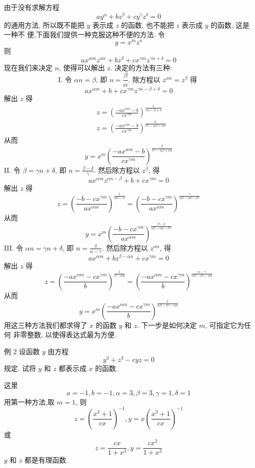 由于没有求解方程
\[
a y^{\alpha}+b z^{\beta}+c y^{\gamma} z^{\delta}=0
\]
的通用方法, 所以既不能把 $y$ 表示成 $z$ 的函数, 也不能把 $z$ 表示成 $y$ 的函数. 这是一种不 便,下面我们提供一种克服这种不便的方法. 令
\[
y=x^{m} z^{n}
\]
则
\[
a x^{\alpha m} z^{\alpha n}+b z^{\beta}+c x^{\gamma m} z^{\gamma n+\delta}=0
\]
现在我们来决定 $n$, 使得可以解出 $z$. 决定的方法有三种:
\[
\mathrm{I} \text {. 令 } \alpha n=\beta \text {, 即 } n=\frac{\beta}{\alpha} \text {. 除方程以 } z^{\alpha n}=z^{\beta} \text { 得 }
\]
\[
a x^{\alpha m}+b+c x^{\gamma m} z^{\gamma n-\beta+\delta}=0
\]
解出 $z$ 得
\[
\begin{aligned}
& z=\left(\frac{-a x^{\alpha m}-b}{c x^{\gamma m}}\right)^{\frac{1}{\gamma n-\beta+\delta}} \\
& z=\left(\frac{-a x^{\alpha m}-b}{c x^{\gamma m}}\right)^{\frac{\alpha}{\beta \gamma-\alpha \beta+\alpha \delta}}
\end{aligned}
\]
从而
\[
y=x^{m}\left(\frac{-a x^{\alpha m}-b}{c x^{\gamma m}}\right)^{\frac{\beta}{\beta \gamma-\alpha \beta+\alpha \delta}}
\]
II. 令 $\beta=\gamma n+\delta$, 即 $n=\frac{\beta-\delta}{\gamma}$. 然后除方程以 $z^{\beta}$, 得
\[
a x^{\alpha m} z^{\alpha n-\beta}+b+c x^{\gamma m}=0
\]
解出 $z$ 得
\[
z=\left(\frac{-b-c x^{\gamma m}}{a x^{\alpha m}}\right)^{\frac{1}{\alpha n-\beta}}=\left(\frac{-b-c x^{\gamma m}}{a x^{\alpha m}}\right)^{\frac{\gamma}{\alpha \beta-\alpha \delta-\beta \gamma}}
\]
从而
\[
y=x^{m}\left(\frac{-b-c x^{\gamma m}}{a x^{\alpha m}}\right)^{\frac{\beta-\delta}{\alpha \beta-\alpha \delta-\beta \gamma}}
\]
III. 令 $\alpha n=\gamma n+\delta$, 即 $n=\frac{\delta}{\alpha-\gamma}$. 然后除方程以 $z^{\alpha n}$, 得
\[
a x^{\alpha m}+b z^{\beta-\alpha n}+c x^{\gamma m}=0
\]
解出 $z$ 得
\[
z=\left(\frac{-a x^{\alpha m}-c x^{\gamma m}}{b}\right)^{\frac{1}{\beta-\alpha n}}=\left(\frac{-a x^{\alpha m}-c x^{\gamma m}}{b}\right)^{\frac{\alpha-\gamma}{\alpha \beta-\beta \gamma-\alpha \delta}}
\]
从而
\[
y=x^{m}\left(\frac{-a x^{\alpha m}-c x^{\gamma m}}{b}\right)^{\frac{\delta}{\alpha \beta-\beta \gamma-\alpha \delta}}
\]
用这三种方法我们都求得了 $x$ 的函数 $y$ 和 $z$. 下一步是如何决定 $m$, 可指定它为任何 非零整数, 以使得表达式最为方便. 

例 2 设函数 $y$ 由方程
\[
y^{3}+z^{3}-c y z=0
\]
规定. 试将 $y$ 和 $z$ 都表示成 $x$ 的函数.

这里
\[
a=-1, b=-1, \alpha=3, \beta=3, \gamma=1, \delta=1
\]
用第一种方法,取 $m=1$, 则
\[
z=\left(\frac{x^{3}+1}{c x}\right)^{-1}, y=x\left(\frac{x^{3}+1}{c x}\right)^{-1}
\]
或
\[
z=\frac{c x}{1+x^{3}}, y=\frac{c x^{2}}{1+x^{3}}
\]
$y$ 和 $z$ 都是有理函数.

